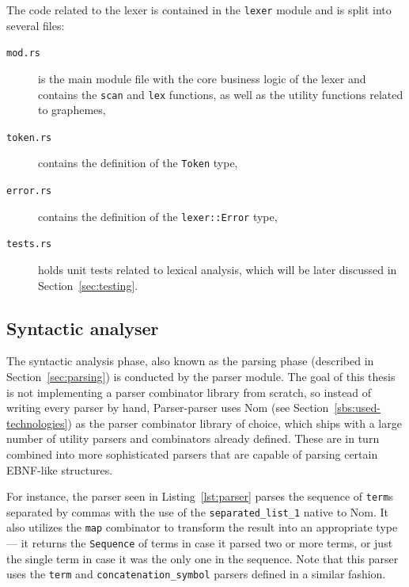\documentclass[english,bachelors,forcepolishlogotype]{wizthesis}
\newcommand{\thisproject}{Parser-parser}
\begin{document}
The code related to the lexer is contained in the \texttt{lexer} module and is
split into several files:
\begin{description}
  \item[\texttt{mod.rs}] is the main module file with the core business logic of
  the lexer and contains the \texttt{scan} and \texttt{lex} functions, as well
  as the utility functions related to graphemes,
  \item[\texttt{token.rs}] contains the definition of the \texttt{Token} type,
  \item[\texttt{error.rs}] contains the definition of the \texttt{lexer::Error}
  type,
  \item[\texttt{tests.rs}] holds unit tests related to lexical analysis, which
  will be later discussed in Section~\ref{sec:testing}.
\end{description}

\subsection{Syntactic analyser} \label{sbs:syntactic-analyser}

The syntactic analysis phase, also known as the parsing phase (described in
Section~\ref{sec:parsing}) is conducted by the parser module. The goal of this
thesis is not implementing a parser combinator library from scratch, so instead
of writing every parser by hand, \thisproject{} uses Nom (see
Section~\ref{sbs:used-technologies}) as the parser combinator library of
choice, which ships with a large number of utility parsers and combinators
already defined. These are in turn combined into more sophisticated parsers that
are capable of parsing certain EBNF-like structures.


For instance, the parser seen in Listing~\ref{lst:parser} parses the sequence of
\texttt{term}s separated by commas with the use of the
\texttt{separated\_list\_1} native to Nom. It also utilizes the \texttt{map}
combinator to transform the result into an appropriate type --- it returns the
\texttt{Sequence} of terms in case it parsed two or more terms, or just the
single term in case it was the only one in the sequence. Note that this parser
uses the \texttt{term} and \texttt{concatenation\_symbol} parsers defined
in a similar fashion.
\end{document}
